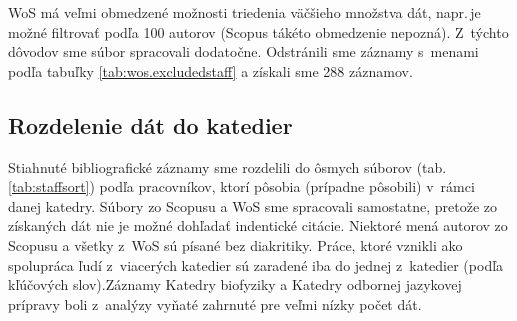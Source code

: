 WoS má veľmi obmedzené možnosti triedenia väčšieho množstva dát, napr.\,je možné
filtrovať podľa 100 autorov (Scopus tákéto obmedzenie nepozná).  Z~týchto
dôvodov sme súbor  spracovali dodatočne.
Odstránili sme záznamy s~menami podľa tabuľky \ref{tab:wos.excludedstaff} a
získali sme 288 záznamov.


\subsection{Rozdelenie dát do katedier}

Stiahnuté bibliografické záznamy sme rozdelili do ôsmych súborov
(tab.\,\ref{tab:staffsort}) podľa pracovníkov, ktorí pôsobia (prípadne pôsobili)
v~rámci danej katedry.  Súbory zo Scopusu a WoS sme spracovali samostatne,
pretože zo získaných dát nie je možné dohľadať indentické citácie.  Niektoré
mená autorov zo Scopusu a všetky z~WoS sú písané bez diakritiky.  Práce, ktoré
vznikli ako spolupráca ľudí z~viacerých katedier sú zaradené iba do jednej
z~katedier (podľa kľúčových slov).Záznamy Katedry biofyziky a Katedry odbornej
jazykovej prípravy boli z~analýzy vyňaté zahrnuté pre veľmi nízky počet dát.

